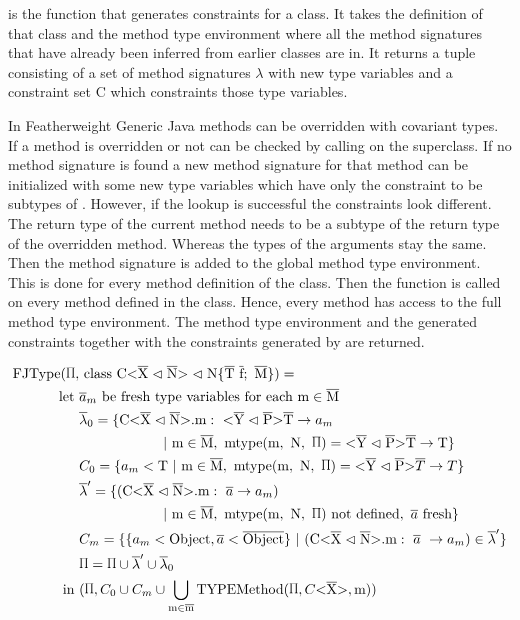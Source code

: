  is the function that generates constraints for a class. It takes the definition of that class and the method type environment where all the method signatures that have already been inferred from earlier classes are in.
It returns a tuple consisting of a set of method signatures $\lambda$ with new type variables and a constraint set C which constraints those type variables.

In Featherweight Generic Java methods can be overridden with covariant types. If a method is overridden or not can be checked by calling  on the superclass.
If no method signature is found a new method signature for that method can be initialized with some new type variables which have only the constraint to be subtypes of .
However, if the  lookup is successful the constraints look different. The return type of the current method needs to be a subtype of the return type of the overridden method.
Whereas the types of the arguments stay the same. Then the method signature is added to the global method type environment.
This is done for every method definition of the class. Then the  function is called on every method defined in the class. Hence, every method has access to the full method type environment.
The method type environment and the generated constraints together with the constraints generated by  are returned.

\begin{align*}
    \text{FJType}(\sprod{0.7}, & \ \classheader \{ \ot{T} \ \ot{f}; \ \ot{M} \}) = \\
    \text{let} \ & \overline{a}_m \ \text{be fresh type variables for each m} \in \ot{M} \\
    & \overline{\lambda}_0 = \{\cm : \ \yp \ot{T} \to a_m \\
    & \quad \quad \quad \quad \quad \quad | \ \text{m} \in \ot{M}, \ \mtype = \yp \ot{T} \to \text{T} \}\\
    & C_0 = \{ a_m < \text{T} \ | \ \text{m} \in \ot{M}, \ \mtype = \yp \oto{T} \}\\
    & \overline{\lambda}' = \{ ( \cm : \ \overline{a} \to a_m ) \\
    & \quad \quad \quad \quad \quad \quad | \ \text{m} \in \ot{M}, \ \mtype \ \text{not defined}, \ \fresh{\overline{a}} \}\\
    & C_m = \{\{ a_m < \text{Object}, \overline{a} < \ot{Object} \} \ | \ ( \cm : \ \overline{a} \ \to a_m) \in \overline{\lambda}' \} \\
    & \sprod{0.7} = \sprod{0.7} \cup \overline{\lambda}' \cup \overline{\lambda}_0\\
\text{in} \ &(\sprod{0.7}, C_0 \cup C_m \cup \bigcup_{ \text{m} \in \ot{m} } \text{TYPEMethod}(\sprod{0.7}, C \vv{\ot{X}}, \text{m}))\\
\end{align*}

